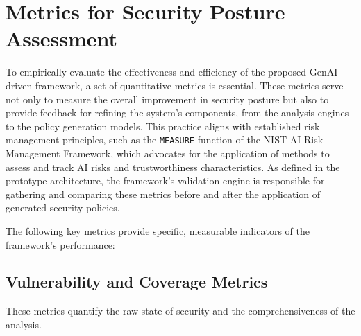 

\section{Metrics for Security Posture Assessment} %
\label{sec:Metrics for Security Posture Assessment}

To empirically evaluate the effectiveness and efficiency of the proposed GenAI-driven framework, a set of quantitative metrics is essential. These metrics serve not only to measure the overall improvement in security posture but also to provide feedback for refining the system's components, from the analysis engines to the policy generation models. This practice aligns with established risk management principles, such as the \texttt{MEASURE} function of the NIST AI Risk Management Framework, which advocates for the application of methods to assess and track AI risks and trustworthiness characteristics. As defined in the prototype architecture, the framework's validation engine is responsible for gathering and comparing these metrics before and after the application of generated security policies.

The following key metrics provide specific, measurable indicators of the framework's performance:

\subsection*{Vulnerability and Coverage Metrics}
These metrics quantify the raw state of security and the comprehensiveness of the analysis.

